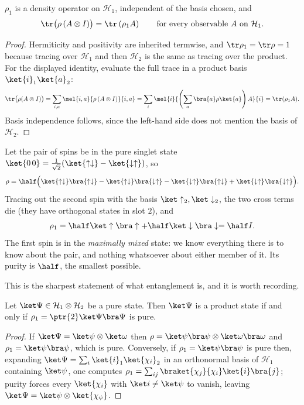 \begin{proposition}
    $\rho_1$ is a density operator on $\mathcal{H}_1$, independent of the basis chosen, and
    $$
    \tr\big( \rho\, (A\otimes I) \big) = \tr\left( \rho_1 A \right) \qquad \text{for every observable } A \text{ on } \mathcal{H}_1.
    $$
\end{proposition}
\begin{proof}
    Hermiticity and positivity are inherited termwise, and $\tr\rho_1 = \tr\rho = 1$ because tracing over $\mathcal{H}_1$ and then $\mathcal{H}_2$ is the same as tracing over the product. For the displayed identity, evaluate the full trace in a product basis $\ket{i}_1\ket{a}_2$:
    $$
    \tr\big(\rho(A\otimes I)\big) = \sum_{i,a}\mel{i,a}{\rho\,(A\otimes I)}{i,a} = \sum_i \mel{i}{\left(\sum_a \bra{a}\rho\ket{a}\right)A}{i} = \tr(\rho_1 A).
    $$
    Basis independence follows, since the left-hand side does not mention the basis of $\mathcal{H}_2$. \qedhere
\end{proof}

\begin{example}
    Let the pair of spins be in the pure singlet state $\ket{0\,0} = \frac{1}{\sqrt2}(\ket{\uparrow\downarrow}-\ket{\downarrow\uparrow})$, so
    $$
    \rho = \half\Big( \ket{\uparrow\downarrow}\bra{\uparrow\downarrow} - \ket{\uparrow\downarrow}\bra{\downarrow\uparrow} - \ket{\downarrow\uparrow}\bra{\uparrow\downarrow} + \ket{\downarrow\uparrow}\bra{\downarrow\uparrow} \Big).
    $$
    Tracing out the second spin with the basis $\ket\uparrow_2, \ket\downarrow_2$, the two cross terms die (they have orthogonal states in slot $2$), and
    $$
    \rho_1 = \half\ket\uparrow\bra\uparrow + \half\ket\downarrow\bra\downarrow = \half I.
    $$
    The first spin is in the \emph{maximally mixed} state: we know everything there is to know about the pair, and nothing whatsoever about either member of it. Its purity is $\half$, the smallest possible.
\end{example}

This is the sharpest statement of what entanglement is, and it is worth recording.

\begin{proposition}
    Let $\ket\Psi \in \mathcal{H}_1\otimes\mathcal{H}_2$ be a pure state. Then $\ket\Psi$ is a product state if and only if $\rho_1 = \ptr{2}\ket\Psi\bra\Psi$ is pure.
\end{proposition}
\begin{proof}
    If $\ket\Psi = \ket\psi\otimes\ket\omega$ then $\rho = \ket\psi\bra\psi\otimes\ket\omega\bra\omega$ and $\rho_1 = \ket\psi\bra\psi$, which is pure. Conversely, if $\rho_1 = \ket\psi\bra\psi$ is pure then, expanding $\ket\Psi = \sum_{i} \ket{i}_1\ket{\chi_i}_2$ in an orthonormal basis of $\mathcal{H}_1$ containing $\ket\psi$, one computes $\rho_1 = \sum_{ij}\braket{\chi_j}{\chi_i}\ket{i}\bra{j}$; purity forces every $\ket{\chi_i}$ with $\ket i \neq \ket\psi$ to vanish, leaving $\ket\Psi = \ket\psi\otimes\ket{\chi_\psi}$.
\end{proof}


